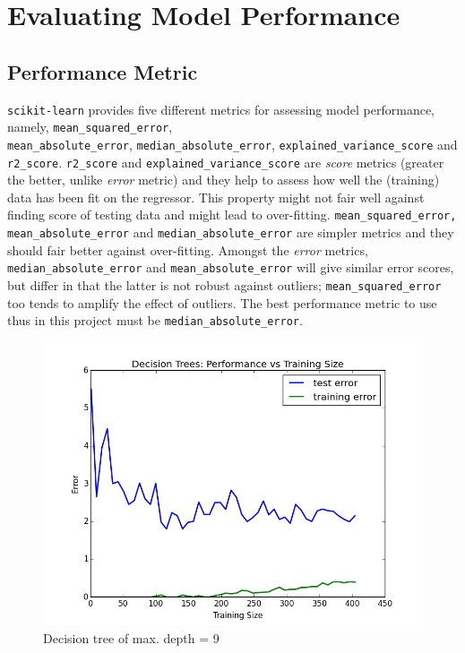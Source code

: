\documentclass{article}
\begin{document}
	\section{Evaluating Model Performance}
	\subsection{Performance Metric}
	\texttt{scikit-learn} provides five different metrics for assessing model performance, namely, \texttt{mean\_squared\_error}, \\ \texttt{mean\_absolute\_error}, \texttt{median\_absolute\_error}, \texttt{explained\_variance\_score} and \texttt{r2\_score}. \texttt{r2\_score} and \texttt{explained\_variance\_score} are \emph{score} metrics (greater the better, unlike \emph{error} metric) and they help to assess how well the (training) data has been fit on the regressor. This property might not fair well against finding score of testing data and might lead to over-fitting. \texttt{mean\_squared\_error, mean\_absolute\_error} and \texttt{median\_absolute\_error} are simpler metrics and they should fair better against over-fitting. Amongst the \emph{error} metrics, \texttt{median\_absolute\_error} and \texttt{mean\_absolute\_error} will give similar error scores, but differ in that the latter is not robust against outliers; \texttt{mean\_squared\_error} too tends to amplify the effect of outliers. The best performance metric to use thus in this project must be \texttt{median\_absolute\_error}. 
	\begin{figure}[!ht]
		\centering
		\includegraphics[scale=0.5]{example_decision_tree_error_graph_depth_9}
		\caption{Decision tree of max. depth = 9}
		\label{fig:decisionTreeDepth9}
	\end{figure}
\end{document}
